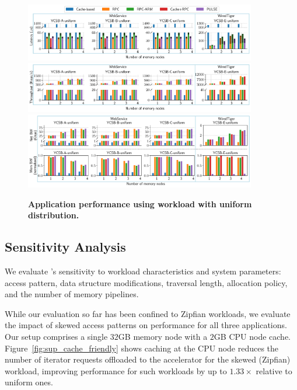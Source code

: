 \begin{figure}[t]
\centering
  \includegraphics[width=0.9\textwidth]{fig/pulse/latency_uniform.pdf}\vspace{-.5em}
  \label{fig:sup_eval_perf_e2e_latency_uniform}
  \includegraphics[width=0.9\textwidth]{fig/pulse/throughput_uniform.pdf}
  \label{fig:sup_eval_perf_e2e_throughput_uniform}
  \includegraphics[width=0.9\textwidth]{fig/pulse/network_memory_uniform.pdf}
  \label{fig:sup_eval_perf_e2e_utilization_uniform}
  \vspace{-1.25em}
  \caption[Application performance using workload with uniform distribution]{\textbf{Application performance using workload with uniform distribution.}}
  \label{fig:sup_eval_uniform}

\vspace{-1.5em}
\end{figure}


\subsection{\pulse Sensitivity Analysis}
\label{ssec:sensitivity}


We evaluate \pulse's sensitivity to workload characteristics and system parameters: access pattern, data structure modifications, traversal length, allocation policy, and the number of \pulse memory pipelines. 


While our evaluation so far has been confined to Zipfian workloads, we evaluate the impact of skewed access patterns on \pulse performance for all three applications. Our setup comprises a single $32$GB memory node with a $2$GB CPU node cache. Figure~\ref{fig:sup_cache_friendly} shows caching at the CPU node reduces the number of iterator requests offloaded to the \pulse accelerator for the skewed (Zipfian) workload, improving \pulse performance for such workloads by up to $1.33\times$ relative to uniform ones.

